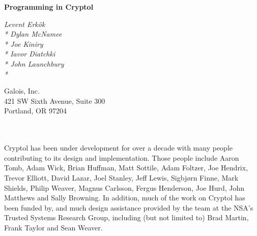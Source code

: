 \noindent
\begin{center}
{\LARGE \bf Programming in Cryptol}

{\it Levent Erkök\\*
Dylan McNamee \\*
Joe Kiniry \\*
Iavor Diatchki \\*
John Launchbury \\*
}

\end{center}

\vspace{0.5in}
\noindent
Galois, Inc.\\
421 SW Sixth Avenue, Suite 300 \\
Portland, OR 97204

\pagebreak
{}\\
\\
\noindent
Cryptol has been under development for over a decade with many people
contributing to its design and implementation. Those people include
Aaron Tomb, Adam Wick, Brian Huffman, Matt Sottile, Adam Foltzer, Joe Hendrix,
Trevor Elliott,
David Lazar, Joel Stanley, Jeff Lewis,
Sigbjørn Finne, Mark Shields, Philip Weaver, Magnus Carlsson, Fergus Henderson, Joe Hurd,
John Matthews and Sally Browning. In addition, much of the work on Cryptol has been funded by, and
much design assistance provided by the team at the NSA's Trusted Systems
Research Group, including (but not limited to) Brad Martin, Frank Taylor and
Sean Weaver.

\vspace{1in}
\pagebreak
